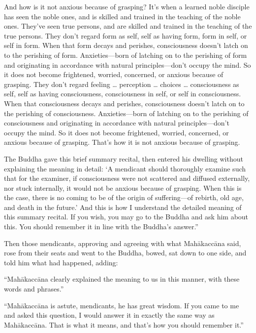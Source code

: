 \documentclass[12pt,openany]{book}%
\begin{document}
And how is it not anxious because of grasping? It’s when a learned noble disciple has seen the noble ones, and is skilled and trained in the teaching of the noble ones. They’ve seen true persons, and are skilled and trained in the teaching of the true persons. They don’t regard form as self, self as having form, form in self, or self in form. When that form decays and perishes, consciousness doesn’t latch on to the perishing of form. Anxieties—born of latching on to the perishing of form and originating in accordance with natural principles—don’t occupy the mind. So it does not become frightened, worried, concerned, or anxious because of grasping. They don’t regard feeling … perception … choices … consciousness as self, self as having consciousness, consciousness in self, or self in consciousness. When that consciousness decays and perishes, consciousness doesn’t latch on to the perishing of consciousness. Anxieties—born of latching on to the perishing of consciousness and originating in accordance with natural principles—don’t occupy the mind. So it does not become frightened, worried, concerned, or anxious because of grasping. That’s how it is not anxious because of grasping. 

The Buddha gave this brief summary recital, then entered his dwelling without explaining the meaning in detail: ‘A mendicant should thoroughly examine such that for the examiner, if consciousness were not scattered and diffused externally, nor stuck internally, it would not be anxious because of grasping. When this is the case, there is no coming to be of the origin of suffering—of rebirth, old age, and death in the future.’ And this is how I understand the detailed meaning of this summary recital. If you wish, you may go to the Buddha and ask him about this. You should remember it in line with the Buddha’s answer.” 

Then those mendicants, approving and agreeing with what \textsanskrit{Mahākaccāna} said, rose from their seats and went to the Buddha, bowed, sat down to one side, and told him what had happened, adding: 

“\textsanskrit{Mahākaccāna} clearly explained the meaning to us in this manner, with these words and phrases.” 

“\textsanskrit{Mahākaccāna} is astute, mendicants, he has great wisdom. If you came to me and asked this question, I would answer it in exactly the same way as \textsanskrit{Mahākaccāna}. That is what it means, and that’s how you should remember it.” 
\end{document}
